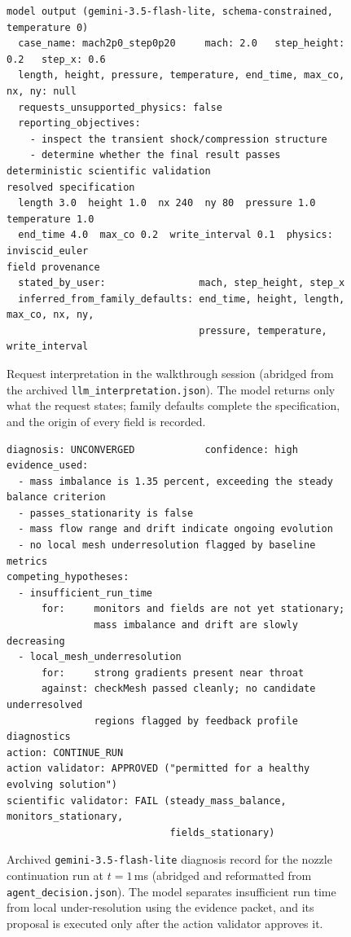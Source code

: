 \documentclass[11pt]{article}
\begin{document}
\begin{figure}[!h]
\centering
\begin{minipage}{0.96\linewidth}
\footnotesize
\begin{verbatim}
model output (gemini-3.5-flash-lite, schema-constrained, temperature 0)
  case_name: mach2p0_step0p20     mach: 2.0   step_height: 0.2   step_x: 0.6
  length, height, pressure, temperature, end_time, max_co, nx, ny: null
  requests_unsupported_physics: false
  reporting_objectives:
    - inspect the transient shock/compression structure
    - determine whether the final result passes deterministic scientific validation
resolved specification
  length 3.0  height 1.0  nx 240  ny 80  pressure 1.0  temperature 1.0
  end_time 4.0  max_co 0.2  write_interval 0.1  physics: inviscid_euler
field provenance
  stated_by_user:                mach, step_height, step_x
  inferred_from_family_defaults: end_time, height, length, max_co, nx, ny,
                                 pressure, temperature, write_interval
\end{verbatim}
\end{minipage}
\caption{Request interpretation in the walkthrough session (abridged from the
archived \texttt{llm\_interpretation.json}). The model returns only what the
request states; family defaults complete the specification, and the origin of
every field is recorded.}
\label{fig:walk_spec}
\end{figure}

\begin{figure}[!h]
\centering
\begin{minipage}{0.96\linewidth}
\footnotesize
\begin{verbatim}
diagnosis: UNCONVERGED            confidence: high
evidence_used:
  - mass imbalance is 1.35 percent, exceeding the steady balance criterion
  - passes_stationarity is false
  - mass flow range and drift indicate ongoing evolution
  - no local mesh underresolution flagged by baseline metrics
competing_hypotheses:
  - insufficient_run_time
      for:     monitors and fields are not yet stationary;
               mass imbalance and drift are slowly decreasing
  - local_mesh_underresolution
      for:     strong gradients present near throat
      against: checkMesh passed cleanly; no candidate underresolved
               regions flagged by feedback profile diagnostics
action: CONTINUE_RUN
action validator: APPROVED ("permitted for a healthy evolving solution")
scientific validator: FAIL (steady_mass_balance, monitors_stationary,
                            fields_stationary)
\end{verbatim}
\end{minipage}
\caption{Archived \texttt{gemini-3.5-flash-lite} diagnosis record for the
nozzle continuation run at $t=1$\,ms (abridged and reformatted from
\texttt{agent\_decision.json}). The model separates
insufficient run time from local under-resolution using the evidence packet,
and its proposal is executed only after the action validator approves it.}
\label{fig:trace}
\end{figure}
\end{document}
